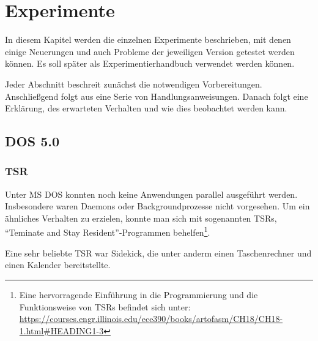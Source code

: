 \chapter{Experimente}
\label{chap:experiments}

In diesem Kapitel werden die einzelnen Experimente beschrieben, mit denen einige Neuerungen und auch Probleme der jeweiligen Version getestet werden können. Es soll später als Experimentierhandbuch verwendet werden können.

Jeder Abschnitt beschreit zunächst die notwendigen Vorbereitungen.
Anschließgend folgt aus eine Serie von Handlungsanweisungen. Danach folgt eine Erklärung, des erwarteten Verhalten und wie dies beobachtet werden kann.




\section{DOS 5.0}

	\subsection{TSR}

	Unter MS DOS konnten noch keine Anwendungen parallel ausgeführt werden. Insbesondere waren  Daemons oder Backgroundprozesse nicht vorgesehen.
	Um ein ähnliches Verhalten zu erzielen, konnte man sich mit sogenannten TSRs, "`Teminate and Stay Resident"'-Programmen behelfen\footnote{Eine hervorragende Einführung in die Programmierung und die Funktionsweise von TSRs befindet sich unter: \url{https://courses.engr.illinois.edu/ece390/books/artofasm/CH18/CH18-1.html\#HEADING1-3}}. 

	Eine sehr beliebte TSR war Sidekick, die unter anderm einen Taschenrechner und einen Kalender bereitstellte.

